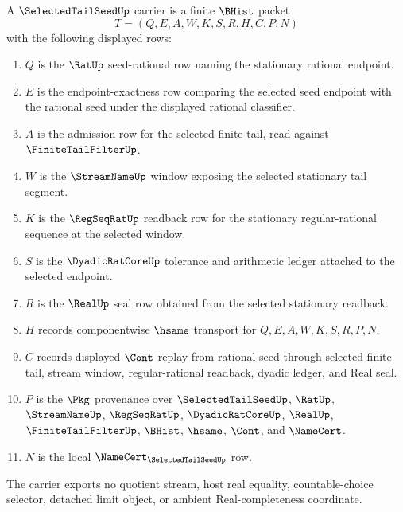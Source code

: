 \begin{definition}
\label{def:selected-tail-seed-carrier}
A $\SelectedTailSeedUp$ carrier is a finite $\BHist$ packet
$$
T=(Q,E,A,W,K,S,R,H,C,P,N)
$$
with the following displayed rows:
\begin{enumerate}
\item $Q$ is the $\RatUp$ seed-rational row naming the stationary rational endpoint.
\item $E$ is the endpoint-exactness row comparing the selected seed endpoint with the rational seed under the displayed rational classifier.
\item $A$ is the admission row for the selected finite tail, read against $\FiniteTailFilterUp$.
\item $W$ is the $\StreamNameUp$ window exposing the selected stationary tail segment.
\item $K$ is the $\RegSeqRatUp$ readback row for the stationary regular-rational sequence at the selected window.
\item $S$ is the $\DyadicRatCoreUp$ tolerance and arithmetic ledger attached to the selected endpoint.
\item $R$ is the $\RealUp$ seal row obtained from the selected stationary readback.
\item $H$ records componentwise $\hsame$ transport for $Q,E,A,W,K,S,R,P,N$.
\item $C$ records displayed $\Cont$ replay from rational seed through selected finite tail, stream window, regular-rational readback, dyadic ledger, and Real seal.
\item $P$ is the $\Pkg$ provenance over $\SelectedTailSeedUp$, $\RatUp$, $\StreamNameUp$, $\RegSeqRatUp$, $\DyadicRatCoreUp$, $\RealUp$, $\FiniteTailFilterUp$, $\BHist$, $\hsame$, $\Cont$, and $\NameCert$.
\item $N$ is the local $\NameCert_{\SelectedTailSeedUp}$ row.
\end{enumerate}
The carrier exports no quotient stream, host real equality, countable-choice selector, detached limit object, or ambient Real-completeness coordinate.
\end{definition}

